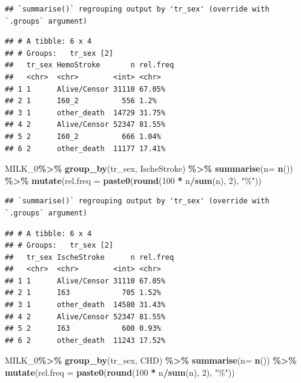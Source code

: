 \documentclass[
]{article}
\newenvironment{Shaded}{\begin{snugshade}}{\end{snugshade}}
\newcommand{\DataTypeTok}[1]{\textcolor[rgb]{0.13,0.29,0.53}{#1}}
\newcommand{\DecValTok}[1]{\textcolor[rgb]{0.00,0.00,0.81}{#1}}
\newcommand{\KeywordTok}[1]{\textcolor[rgb]{0.13,0.29,0.53}{\textbf{#1}}}
\newcommand{\NormalTok}[1]{#1}
\newcommand{\OperatorTok}[1]{\textcolor[rgb]{0.81,0.36,0.00}{\textbf{#1}}}
\newcommand{\StringTok}[1]{\textcolor[rgb]{0.31,0.60,0.02}{#1}}
\begin{document}
\begin{verbatim}
## `summarise()` regrouping output by 'tr_sex' (override with `.groups` argument)
\end{verbatim}

\begin{verbatim}
## # A tibble: 6 x 4
## # Groups:   tr_sex [2]
##   tr_sex HemoStroke       n rel.freq
##   <chr>  <chr>        <int> <chr>   
## 1 1      Alive/Censor 31110 67.05%  
## 2 1      I60_2          556 1.2%    
## 3 1      other_death  14729 31.75%  
## 4 2      Alive/Censor 52347 81.55%  
## 5 2      I60_2          666 1.04%   
## 6 2      other_death  11177 17.41%
\end{verbatim}

\begin{Shaded}
\begin{Highlighting}[]
\NormalTok{MILK\_}\DecValTok{0}\OperatorTok{\%\textgreater{}\%}\StringTok{ }
\StringTok{  }\KeywordTok{group\_by}\NormalTok{(tr\_sex, IscheStroke) }\OperatorTok{\%\textgreater{}\%}
\StringTok{  }\KeywordTok{summarise}\NormalTok{(}\DataTypeTok{n=} \KeywordTok{n}\NormalTok{()) }\OperatorTok{\%\textgreater{}\%}
\StringTok{  }\KeywordTok{mutate}\NormalTok{(}\DataTypeTok{rel.freq =} \KeywordTok{paste0}\NormalTok{(}\KeywordTok{round}\NormalTok{(}\DecValTok{100} \OperatorTok{*}\StringTok{ }\NormalTok{n}\OperatorTok{/}\KeywordTok{sum}\NormalTok{(n), }\DecValTok{2}\NormalTok{), }\StringTok{"\%"}\NormalTok{))}
\end{Highlighting}
\end{Shaded}

\begin{verbatim}
## `summarise()` regrouping output by 'tr_sex' (override with `.groups` argument)
\end{verbatim}

\begin{verbatim}
## # A tibble: 6 x 4
## # Groups:   tr_sex [2]
##   tr_sex IscheStroke      n rel.freq
##   <chr>  <chr>        <int> <chr>   
## 1 1      Alive/Censor 31110 67.05%  
## 2 1      I63            705 1.52%   
## 3 1      other_death  14580 31.43%  
## 4 2      Alive/Censor 52347 81.55%  
## 5 2      I63            600 0.93%   
## 6 2      other_death  11243 17.52%
\end{verbatim}

\begin{Shaded}
\begin{Highlighting}[]
\NormalTok{MILK\_}\DecValTok{0}\OperatorTok{\%\textgreater{}\%}\StringTok{ }
\StringTok{  }\KeywordTok{group\_by}\NormalTok{(tr\_sex, CHD) }\OperatorTok{\%\textgreater{}\%}
\StringTok{  }\KeywordTok{summarise}\NormalTok{(}\DataTypeTok{n=} \KeywordTok{n}\NormalTok{()) }\OperatorTok{\%\textgreater{}\%}
\StringTok{  }\KeywordTok{mutate}\NormalTok{(}\DataTypeTok{rel.freq =} \KeywordTok{paste0}\NormalTok{(}\KeywordTok{round}\NormalTok{(}\DecValTok{100} \OperatorTok{*}\StringTok{ }\NormalTok{n}\OperatorTok{/}\KeywordTok{sum}\NormalTok{(n), }\DecValTok{2}\NormalTok{), }\StringTok{"\%"}\NormalTok{))}
\end{Highlighting}
\end{Shaded}
\end{document}
